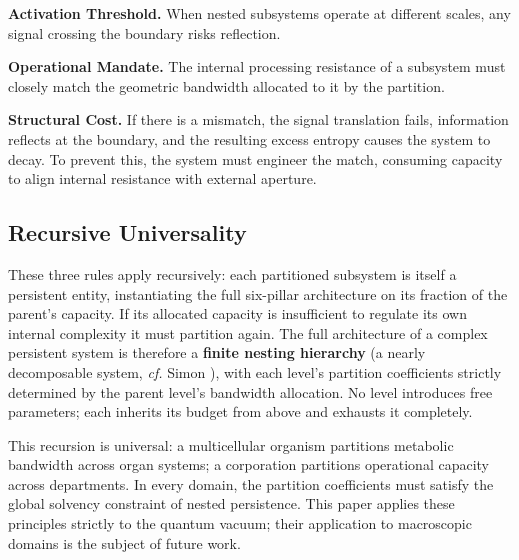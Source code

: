 \textbf{Activation Threshold.} When nested subsystems operate at different scales, any signal crossing the boundary risks reflection.

\textbf{Operational Mandate.} The internal processing resistance of a subsystem must closely match the geometric bandwidth allocated to it by the partition.

\textbf{Structural Cost.} If there is a mismatch, the signal translation fails, information reflects at the boundary, and the resulting excess entropy causes the system to decay. To prevent this, the system must engineer the match, consuming capacity to align internal resistance with external aperture.


\subsection{Recursive Universality}
\label{sec:recursive_universality}
These three rules apply recursively: each partitioned subsystem is itself a persistent entity, instantiating the full 
six-pillar architecture on its fraction of the parent's capacity. If its allocated capacity is insufficient to regulate its own internal complexity it must partition again. The full architecture of a complex persistent system is therefore a \textbf{finite nesting hierarchy} (a nearly decomposable system, \textit{cf.} Simon \cite{klir_architecture_1991}), with each level's partition coefficients strictly determined by the parent level's bandwidth allocation. No level introduces free parameters; each inherits its budget from above and exhausts it completely.

This recursion is universal: a multicellular organism partitions metabolic bandwidth across organ systems; a corporation partitions operational capacity across departments. In every domain, the partition coefficients must satisfy the global solvency constraint of nested persistence.  This paper applies these principles strictly to the quantum vacuum; their application to macroscopic domains is the subject of future work.
